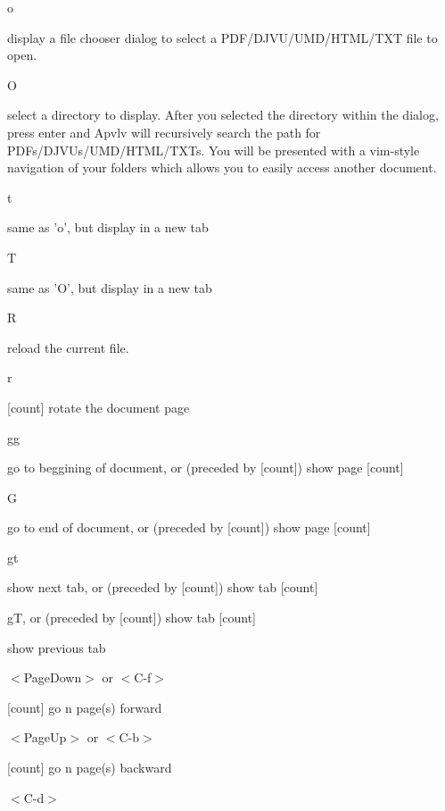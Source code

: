 \documentclass[a4paper,12pt]{article}
\newcommand{\apvlv}{\textsf{Apvlv{ }}}
\begin{document}
\begin{description}

\item o

display a file chooser dialog to select a PDF/\-DJVU/\-UMD/\-HTML/\-TXT file to open.

\item O

select a directory to display. After you selected the directory within the dialog, press enter and \apvlv will recursively search the path for PDFs/DJVUs/UMD/HTML/TXTs. You will be presented with a vim-style navigation of your folders which allows you to easily access another document.

\item t

same as 'o', but display in a new tab

\item T

same as 'O', but display in a new tab

\item R

reload the current file.

\item r

[count] rotate the document page 

\item gg

  go to beggining of document, or (preceded by [count]) show page [count]

\item G

  go to end of document, or (preceded by [count]) show page [count]

\item gt

show next tab, or (preceded by [count]) show tab [count]

\item gT, or (preceded by [count]) show tab [count]

show previous tab

\item $<$PageDown$>$ or $<$C-f$>$

[count] go n page(s) forward

\item $<$PageUp$>$ or
$<$C-b$>$

[count] go n page(s) backward

\item $<$C-d$>$


\end{description}
\end{document}
